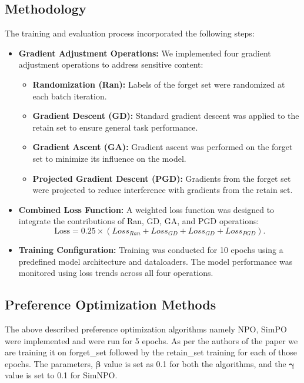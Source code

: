 \documentclass[11pt]{article}
\begin{document}
    \subsection{Methodology}
    The training and evaluation process incorporated the following steps:
    \begin{itemize}
        \item \textbf{Gradient Adjustment Operations:} We implemented four gradient adjustment operations to address sensitive content:
        \begin{itemize}
            \item \textbf{Randomization (Ran):} Labels of the forget set were randomized at each batch iteration.
            \item \textbf{Gradient Descent (GD):} Standard gradient descent was applied to the retain set to ensure general task performance.
            \item \textbf{Gradient Ascent (GA):} Gradient ascent was performed on the forget set to minimize its influence on the model.
            \item \textbf{Projected Gradient Descent (PGD):} Gradients from the forget set were projected to reduce interference with gradients from the retain set.
        \end{itemize}
        \item \textbf{Combined Loss Function:} A weighted loss function was designed to integrate the contributions of Ran, GD, GA, and PGD operations:
            {\small
        \[
            \text{Loss} = 0.25 \times (Loss_{Ran} + Loss_{GD} + Loss_{GD} + Loss_{PGD}).
        \]
        }
        \item \textbf{Training Configuration:} Training was conducted for 10 epochs using a predefined model architecture and dataloaders. The model performance was monitored using loss trends across all four operations.
    \end{itemize}

    \subsection{Preference Optimization Methods}
    The above described preference optimization algorithms namely NPO, SimPO were implemented and were run for 5 epochs. As per the authors of the paper we are training it on forget\_set followed by the retain\_set training for each of those epochs. The parameters, $\boldsymbol{\beta}$  value is set as 0.1 for both the algorithms, and the $\boldsymbol{\gamma}$ value is set to 0.1 for SimNPO.
\end{document}
